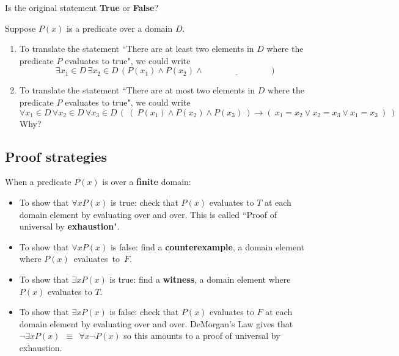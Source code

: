 \documentclass[12pt, oneside]{article}
\begin{document}
\vspace{60pt}


Is the original statement {\bf True} or {\bf False}?

\vfill
 \vfill


Suppose $P(x)$ is  a predicate over a domain $D$.
\begin{enumerate}
    \item To translate the statement
    ``There are at least two  elements in $D$
    where the predicate $P$ evaluates to true", we
    could  write
    \[
    \exists  x_1 \in D \, \exists x_2 \in D  \, (P(x_1) \wedge P(x_2) \wedge \underline{\phantom{\text{FILL IN BLANK}}})
    \]
    \vfill
    \item  To translate the statement
    ``There are at most two  elements in $D$
    where the predicate $P$ evaluates to true", we
    could write
    \[
    \forall  x_1 \in D \, \forall x_2 \in D \, \forall x_3 \in  D \, \left(~ (~P(x_1) \wedge P(x_2)  \wedge P(x_3) ~) \to (~ x_1 = x_2 \vee x_2 = x_3 \vee x_1 = x_3~)~\right)
    \]
    Why?
    \vfill
\end{enumerate} \newpage
\subsection*{Proof strategies}


When a predicate $P(x)$ is over a {\bf finite} domain:
\begin{itemize}
\item To show that $\forall x  P(x)$ is true: check that $P(x)$ evaluates to $T$ at each domain element by evaluating over and over. 
This is called ``Proof of universal by {\bf exhaustion}".
\item To show that $\forall x  P(x)$ is false: find a {\bf counterexample}, a domain element where $P(x)$~evaluates~to~$F$.
\item To show that $\exists x  P(x)$ is true: find a {\bf witness}, a domain element where $P(x)$ evaluates to $T$.
\item To show that $\exists x  P(x)$ is false: check that $P(x)$ evaluates to $F$ at each domain element by evaluating over and over.
DeMorgan's Law gives that $\lnot \exists x P(x) ~~\equiv~~ \forall x \lnot P(x)$ so this amounts to a proof of universal by exhaustion.
\end{itemize} 

 \vfill
\end{document}
